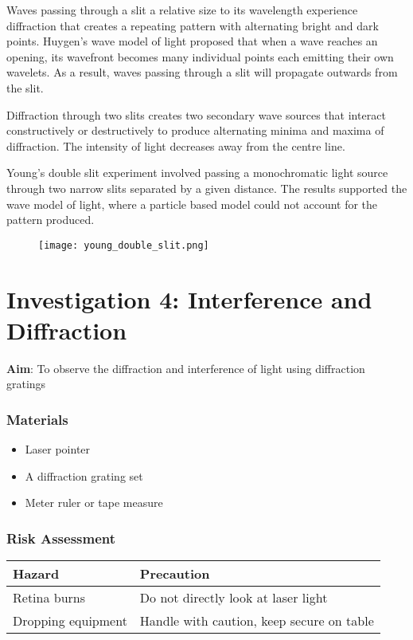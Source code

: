 \documentclass{report}
\begin{document}
			\subitem Waves passing through a slit a relative size to its wavelength experience diffraction that creates a repeating pattern with alternating bright and dark points. Huygen's wave model of light proposed that when a wave reaches an opening, its wavefront becomes many individual points each emitting their own wavelets. As a result, waves passing through a slit will propagate outwards from the slit.

			\subitem Diffraction through two slits creates two secondary wave sources that interact constructively or destructively to produce alternating minima and maxima of diffraction. The intensity of light decreases away from the centre line.

			\subitem Young's double slit experiment involved passing a monochromatic light source through two narrow slits separated by a given distance. The results supported the wave model of light, where a particle based model could not account for the pattern produced.
				
			\begin{figure}[H]
				\centering
				\texttt{[image: young\_double\_slit.png]}
			\end{figure}


\newpage

	\section{Investigation 4: Interference and Diffraction}

		\textbf{Aim}: To observe the diffraction and interference of light using diffraction gratings
		\subsubsection{Materials}

			\begin{itemize}
				\item Laser pointer
				\item A diffraction grating set
				\item Meter ruler or tape measure
			\end{itemize}

		\subsubsection{Risk Assessment}
		
			\begin{table}[H]
				\centering
				\begin{tabular}{p{7cm}|p{7cm}}
					\textbf{Hazard} & \textbf{Precaution} \\ \hline
					Retina burns & Do not directly look at laser light \\
					Dropping equipment & Handle with caution, keep secure on table

				\end{tabular}
			\end{table}
		
\end{document}
